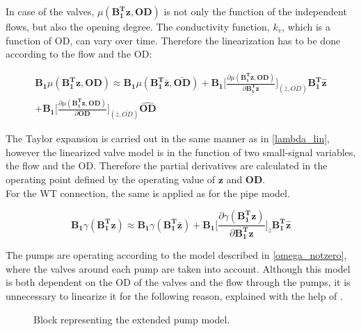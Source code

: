 In case of the valves, $\mu(\bm{{B_1^{T}}}\bm{z}, \bm{OD})$ is not only the function of the independent flows, but also the opening degree. The conductivity function, $k_v$,  which is a function of OD, can vary over time. Therefore the linearization has to be done according to the flow and the OD: 

\begin{equation}
\begin{split}
  \bm{B_1} \mu(\bm{{B_1^{T}}}\bm{z}, \bm{OD}) \approx \bm{B_1} \mu(\bm{B_1^T \bar{ z}}, \bm{\bar{OD}}) + 
  \bm{B_1} \bigg[ \frac{\partial{\mu(\bm{{B_1^{T}}}\bm{z}, \bm{OD})}}{{\partial{\bm{{B_1^{T}}}\bm{z}}}}  \bigg]_{(\bar{z}, \bar{OD})} \bm{{B_1^{T}}} \bm{\hat{z}}
\\ +  \bm{B_1} \bigg[ \frac{\partial{\mu(\bm{{B_1^{T}}}\bm{z}, \bm{OD})}}{{\partial{\bm{OD}}}}  \bigg]_{(\bar{z}, \bar{OD})} \bm{\hat{OD}}
\label{mu_lin}
\end{split}
\end{equation}


The Taylor expansion is carried out in the same manner as in \eqref{lambda_lin}, however the linearized valve model is in the function of two small-signal variables, the flow and the OD. Therefore the partial derivatives are calculated in the operating point defined by the operating value of $\bm{z}$ and $\bm{OD}$. 
\\
For the WT connection, the same is applied as for the pipe model. 

\begin{equation}
  \bm{B_1} \gamma(\bm{{B_1^{T}}}\bm{z}) \approx  \bm{B_1} \gamma(\bm{B_1^T \bar{ z}}) + \bm{B_1} \bigg[ \frac{\partial{\gamma(\bm{{B_1^{T}}}\bm{z})}}{{\partial{\bm{{B_1^{T}}}\bm{z}}}}   \bigg]_{\bar{z}} \bm{{B_1^{T}}}\bm{\hat{z}}
\label{gamma_lin}
\end{equation}

The pumps are operating according to the model described in \eqref{omega_notzero}, where the valves around each pump are taken into account. Although this model is both dependent on the OD of the valves and the flow through the pumps, it is unnecessary to linearize it for the following reason, explained with the help of . 

\begin{figure}[H]
\centering
 
\caption{Block representing the extended pump model.}
\label{fig:pump_model_block}
\end{figure}

